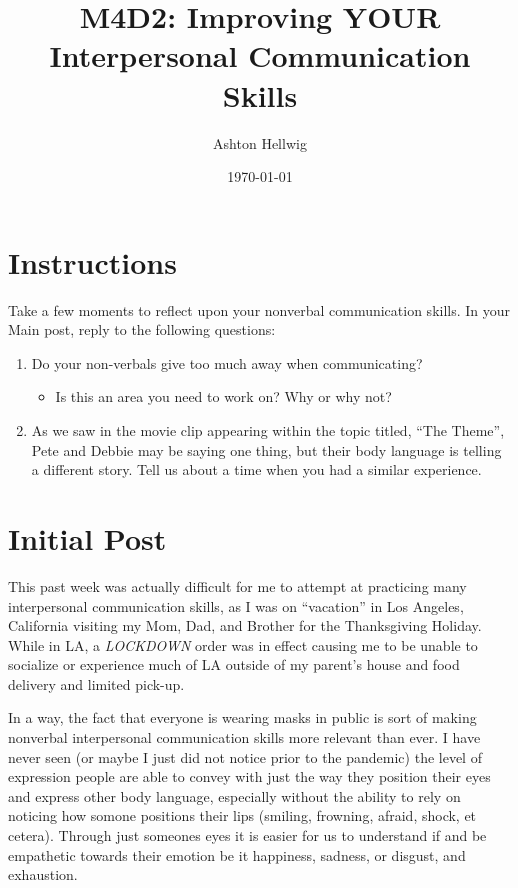 \documentclass[stu,12pt]{apa7}
\title{%
    M4D2: Improving YOUR Interpersonal Communication Skills
  }
\author{Ashton Hellwig}
\date{\today}
\begin{document}
  \maketitle


  \section*{Instructions}
    Take a few moments to reflect upon your nonverbal communication skills.
      In your Main post, reply to the following questions:

    \begin{enumerate}
      \item Do your non-verbals give too much away when communicating?
      \begin{itemize}
        \item Is this an area you need to work on? Why or why not?
      \end{itemize}
      \item As we saw in the movie clip appearing within the topic titled,
        ``The Theme'', Pete and Debbie may be saying one thing, but their body
        language is telling a different story. Tell us about a time when you had
        a similar experience.
    \end{enumerate}


  \newpage
  \section{Initial Post}
    This past week was actually difficult for me to attempt at practicing
      many interpersonal communication skills, as I was on ``vacation'' in
      Los Angeles, California visiting my Mom, Dad, and Brother for the
      Thanksgiving Holiday. While in LA, a \textit{LOCKDOWN} order was in effect
      causing me to be unable to socialize or experience much of LA outside of
      my parent's house and food delivery and limited pick-up.

    In a way, the fact that everyone is wearing masks in public is sort of
      making nonverbal interpersonal communication skills more relevant than
      ever. I have never seen (or maybe I just did not notice prior to the
      pandemic) the level of expression people are able to convey with just
      the way they position their eyes and express other body language,
      especially without the ability to rely on noticing how somone positions
      their lips (smiling, frowning, afraid, shock, et cetera). Through just
      someones eyes it is easier for us to understand if and be empathetic
      towards their emotion be it happiness, sadness, or disgust, and
      exhaustion.
\end{document}
